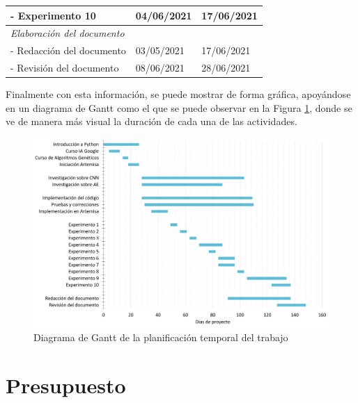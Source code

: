 \begin{table}[!h]
\begin{tabular}{lll}
\multicolumn{1}{l|}{- Experimento 10}                              & \multicolumn{1}{l|}{04/06/2021}                               & 17/06/2021                            \\ \hline
\multicolumn{1}{l|}{\textit{Elaboración del documento}}                     & \multicolumn{1}{l|}{}                                         &                                       \\ \hline
\multicolumn{1}{l|}{- Redacción del documento}                     & \multicolumn{1}{l|}{03/05/2021}                               & 17/06/2021                            \\
\multicolumn{1}{l|}{- Revisión del documento}                      & \multicolumn{1}{l|}{08/06/2021}                               & 28/06/2021   \\
\bottomrule
\end{tabular}
\end{table}

Finalmente con esta información, se puede mostrar de forma gráfica, apoyándose en un diagrama de Gantt como el que se puede observar en la Figura \ref{fig:gantt}, donde se ve de manera más visual la duración de cada una de las actividades.

\begin{figure}[!h]
    \centering
    \includegraphics[width=1\textwidth]{figuras/planificacion/gantt.png}
    \caption{Diagrama de Gantt de la planificación temporal del trabajo}
    \label{fig:gantt}
\end{figure}


\section{Presupuesto}

